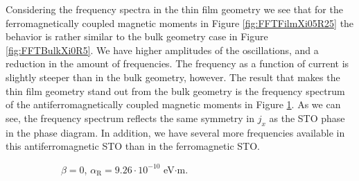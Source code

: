 Considering the frequency spectra in the thin film geometry we see that for the ferromagnetically coupled magnetic moments in Figure \ref{fig:FFTFilmXi05R25} the behavior is rather similar to the bulk geometry case in Figure \ref{fig:FFTBulkXi0R5}. We have higher amplitudes of the oscillations, and a reduction in the amount of frequencies. The frequency as a function of current is slightly steeper than in the bulk geometry, however. The result that makes the thin film geometry stand out from the bulk geometry is the frequency spectrum of the antiferromagnetically coupled magnetic moments in Figure \ref{fig:FFTFilmXi0R25}. As we can see, the frequency spectrum reflects the same symmetry in $j_x$ as the STO phase in the phase diagram. In addition, we have several more frequencies available in this antiferromagnetic STO than in the ferromagnetic STO.
\begin{figure}[h!]
\centering
\begin{subfigure}{.49\textwidth}
  \centering
  \caption{$\beta = 0$, $\alpha_\text{R} = 9.26\cdot10^{-10}$ eV$\cdot$m.}
  \label{fig:FFTFilmXi0R25}
\end{subfigure}%
\begin{subfigure}{.49\textwidth}
  \centering
    \begin{tikzpicture}

\end{tikzpicture}
\end{subfigure}
\end{figure}
